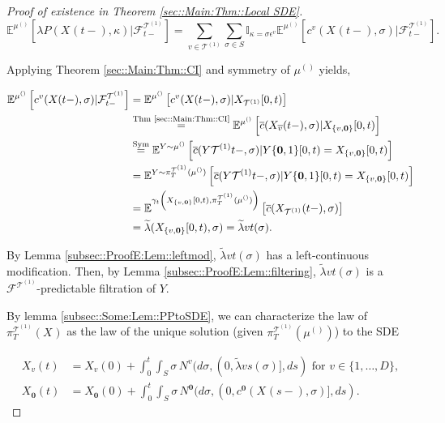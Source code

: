\documentclass[12pt]{article}
\newcommand{\mb}{\mathbb}
\newcommand{\mc}{\mathcal}
\newcommand{\ov}{\overline}
\newcommand{\os}{\overset}
\newcommand{\te}{\text}
\newcommand{\ep}{\epsilon}
\newcommand{\ind}{\hspace{24pt}}
\newcommand{\exmu}[2]{\mb{E}^{#1}\left[#2\right]}	%
\renewcommand{\root}{\mathbf{0}}				%
\renewcommand{\v}{v}							%
\renewcommand{\S}{S}							%
\newcommand{\s}{\sigma}							%
\newcommand{\ev}{\ep}							%
\newcommand{\T}{T}								%
\renewcommand{\t}{t}							%
\newcommand{\proj}{\pi}							%
\renewcommand{\tt}{s}							%
\newcommand{\F}{\mc{F}}							%
\newcommand{\X}{X}								%
\newcommand{\IGr}{c}							%
\newcommand{\vind}[1]{^{#1}}					%
\newcommand{\vsi}[1]{^{#1}}						%
\newcommand{\cind}[1]{_{#1}}					%
\newcommand{\cl}{\ov}							%
\newcommand{\tp}[1]{(#1)}						%
\newcommand{\tip}[1]{#1}						%
\newcommand{\ts}[1]{_{#1}}						%
\newcommand{\degr}{D}							%
\newcommand{\IGrg}{\ov{c}}						%
\newcommand{\tree}{\mc{T}}						%
\newcommand{\sln}[1]{^{(#1)}}					%
\newcommand{\poiss}{N}							%
\newcommand{\rate}{\lambda}						%
\newcommand{\alt}[1]{\widetilde{#1}}			%
\newcommand{\m}{\mu}							%
\newcommand{\cm}{\gamma}						%
\newcommand{\XX}{Y}								%
\renewcommand{\mark}{\kappa}					%
\newcommand{\rp}{P}								%
\newcommand{\crate}{\alt{\lambda}}				%
\begin{document}
\begin{proof}[Proof of existence in Theorem \ref{sec::Main:Thm::Local SDE}]
\[\exmu{\m\sln{}\ts{}}{\rate{\rp{}}(\X\cind{}\tp{\t-},\mark{})|\F\vsi{\tree\sln{1}}\ts{\t-}} = \sum_{\v \in \tree\sln{1}}\sum_{\s\in \S} \mb{I}_{\mark{} = \s\ev\vind{\v}}\exmu{\m\sln{}\ts{}}{\IGr\vind{\v}(\X\cind{}\tp{\t-},\s)|\F\vsi{\tree\sln{1}}\ts{\t-}}.\]

Applying Theorem \ref{sec::Main:Thm::CI} and symmetry of \(\m\sln{}\ts{}\) yields,

\begin{align*}
\exmu{\m\sln{}\ts{}}{\IGr\vind{\v}(\X\cind{}\tp{\t-},\s)|\F\vsi{\tree\sln{1}}\ts{\t-}} &= \exmu{\m\sln{}\ts{}}{\IGr\vind{\v}(\X\cind{}\tp{\t-},\s)|\X\cind{\tree\sln{1}}\tip{[0,\t)}}\\
&\os{\te{Thm \ref{sec::Main:Thm::CI}}}{=} \exmu{\m\sln{}\ts{}}{\IGrg{}(\X\cind{\cl{\v}}\tp{\t-},\s)|\X\cind{\{\v,\root\}}\tip{[0,\t)}} \\
&\os{\te{Sym}}{=} \exmu{\XX{}{}\sim \m\sln{}\ts{}}{\IGrg{}(\XX{\tree\sln{1}}{\t-},\s)|\XX{\{\root,1\}}{[0,\t)} = \X\cind{\{\v,\root\}}\tip{[0,\t)}}\\
&= \exmu{\XX{}{}\sim \proj\vsi{\tree\sln{1}}\ts{\T}(\m\sln{}\ts{})}{\IGrg{}(\XX{\tree\sln{1}}{\t-},\s)|\XX{\{\root,1\}}{[0,\t)} = \X\cind{\{\v,\root\}}\tip{[0,\t)}}\\
&= \exmu{\cm\ts{\t}\left(\X\cind{\{\v,\root\}}\tip{[0,\t)},\proj\vsi{\tree\sln{1}}\ts{\T}(\m\sln{}\ts{})\right)}{\IGrg{}(\X\cind{\tree\sln{1}}\tp{\t-},\s)}\\
&=\crate{}{}(\X\cind{\{\v,\root\}}\tip{[0,\t)},\s) = \crate{\v}{\t}(\s).
\end{align*}

By Lemma \ref{subsec::ProofE:Lem::leftmod}, \(\crate{\v}{\t}(\s)\) has a left-continuous modification. Then, by Lemma \ref{subsec::ProofE:Lem::filtering}, \(\crate{\v}{\t}(\s)\) is a \(\F\vsi{\tree\sln{1}}\ts{}\)-predictable filtration of \(\XX{}{}\).

\ind By lemma \ref{subsec::Some:Lem::PPtoSDE}, we can characterize the law of \(\proj\vsi{\tree\sln{1}}\ts{\T}(\X\cind{}\tip{})\) as the law of the unique solution (given \(\proj\vsi{\tree\sln{1}}\ts{\T}(\m\sln{}\ts{})\)) to the SDE

\begin{align*}
\X\cind{\v}\tp{\t} &= \X\cind{\v}\tp{0} + \int_0^\t\int_\S \s\,\poiss\vind{\v}(d\s,(0,\crate{\v}{\tt}(\s)],d\tt) \te{ for } \v \in \{1,\dots,\degr\},\\
\X\cind{\root}\tp{\t} &= \X\cind{\root}\tp{0} + \int_0^\t\int_\S \s\,\poiss\vind{\root}(d\s,(0,\IGr\vind{\root}(\X\cind{}\tp{\tt-},\s)],d\tt).
\end{align*}
\end{proof}
\end{document}
